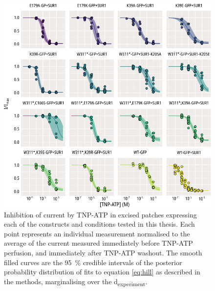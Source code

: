 \begin{figure}[h]
	\centering
	\includegraphics[width=\textwidth]{all_tnpatp_fits.pdf}
	\caption[TNP-ATP inhibition population hill fits]{
	Inhibition of current by TNP-ATP in excised patches expressing each of the constructs and conditions tested in this thesis.
	Each point represents an individual measurement normalised to the average of the current measured immediately before TNP-ATP perfusion, and immediately after TNP-ATP washout.
	The smooth filled curves are the \SI{95}{\percent} credible intervals of the posterior probability distribution of fits to equation \ref{eq:hill} as described in the methods, marginalising over the \textgreek{d}\textsubscript{experiment}.
	}
	\label{apxfig:tnpatp_inhib_1}
\end{figure}

